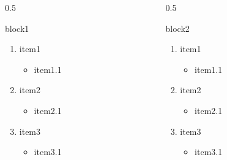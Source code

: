 \documentclass{article}
\begin{document}
\begin{frame}{ }
\begin{columns}
\begin{column}{0.5\textwidth}
\begin{block}{block1}
\begin{enumerate}
        \item item1
        \begin{itemize}
            \item  item1.1
        \end{itemize}
        \item item2
        \begin{itemize}
            \item item2.1
        \end{itemize}
        \item item3
        \begin{itemize}
            \item item3.1
        \end{itemize}
\end{enumerate}    
\end{block}
\end{column}
\begin{column}{0.5\textwidth}
\begin{block}{block2}
\begin{enumerate}
        \item item1
        \begin{itemize}
            \item  item1.1
        \end{itemize}
        \item item2
        \begin{itemize}
            \item item2.1
        \end{itemize}
        \item item3
        \begin{itemize}
            \item item3.1
        \end{itemize}
\end{enumerate}    
\end{block}
\end{column}
\end{columns}
\end{frame}
\end{document}

